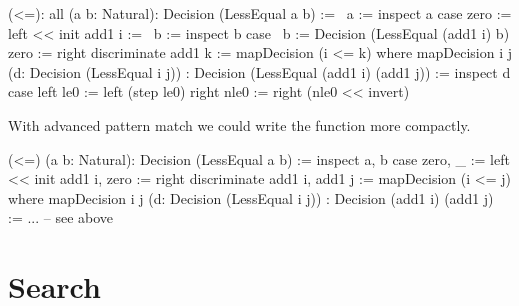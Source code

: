 \begin{alba}
    (<=): all (a b: Natural): Decision (LessEqual a b) :=
        \ a :=
            inspect a case
                zero :=
                    left << init
                add1 i :=
                    \ b :=
                        inspect b case
                            {\ b := Decision (LessEqual (add1 i) b)}
                            zero :=
                                right discriminate
                            add1 k :=
                                mapDecision (i <= k)
        where
            mapDecision
                {i j} (d: Decision (LessEqual i j))
                : Decision (LessEqual (add1 i) (add1 j))
            :=
                inspect d case
                    left le0 :=
                        left (step le0)
                    right nle0 :=
                        right (nle0 << invert)
\end{alba}

With advanced pattern match we could write the function more compactly.

\begin{alba}
    (<=) (a b: Natural): Decision (LessEqual a b) :=
        inspect
            a, b
        case
            zero, _ :=
                left << init
            add1 i, zero :=
                right discriminate
            add1 i, add1 j :=
                mapDecision (i <= j)
        where
            mapDecision {i j} (d: Decision (LessEqual i j))
                : Decision (add1 i) (add1 j)
            :=
                ... -- see above
\end{alba}





\vskip 5mm
\section{Search}

